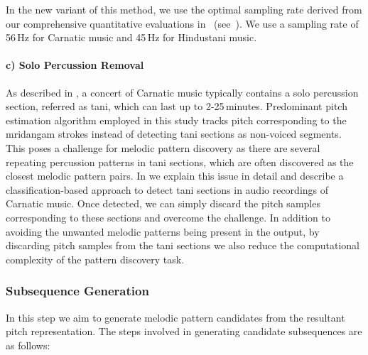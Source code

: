 In the new variant of this method, we use the optimal sampling rate derived from our comprehensive quantitative evaluations in~\cite{gulati_ICASSP2015} (see~). We use a sampling rate of 56\,Hz for Carnatic music and 45\,Hz for Hindustani music.  




\paragraph{c) Solo Percussion Removal} 

As described in , a concert of Carnatic music typically contains a solo percussion section, referred as \gls{tani}, which can last up to 2-25\,minutes. Predominant pitch estimation algorithm employed in this study tracks pitch corresponding to the \gls{mridangam} strokes instead of detecting \gls{tani} sections as non-voiced segments. This poses a challenge for melodic pattern discovery as there are several repeating percussion patterns in \gls{tani} sections, which are often discovered as the closest melodic pattern pairs. In  we explain this issue in detail and describe a classification-based approach to detect \gls{tani} sections in audio recordings of Carnatic music. Once detected, we can simply discard the pitch samples corresponding to these sections and overcome the challenge. In addition to avoiding the unwanted melodic patterns being present in the output, by discarding pitch samples from the \gls{tani} sections we also reduce the computational complexity of the pattern discovery task.


\subsubsection{Subsequence Generation}
\label{sec:subsequencegeneration}

In this step we aim to generate melodic pattern candidates from the resultant pitch representation. The steps involved in generating candidate subsequences are as follows:

